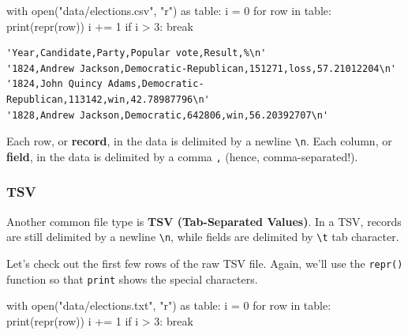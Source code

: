 \documentclass[
  letterpaper,
  DIV=11,
  numbers=noendperiod]{scrreprt}
\newenvironment{Shaded}{\begin{snugshade}}{\end{snugshade}}
\newcommand{\BuiltInTok}[1]{\textcolor[rgb]{0.00,0.23,0.31}{#1}}
\newcommand{\ControlFlowTok}[1]{\textcolor[rgb]{0.00,0.23,0.31}{#1}}
\newcommand{\DecValTok}[1]{\textcolor[rgb]{0.68,0.00,0.00}{#1}}
\newcommand{\ImportTok}[1]{\textcolor[rgb]{0.00,0.46,0.62}{#1}}
\newcommand{\KeywordTok}[1]{\textcolor[rgb]{0.00,0.23,0.31}{#1}}
\newcommand{\NormalTok}[1]{\textcolor[rgb]{0.00,0.23,0.31}{#1}}
\newcommand{\OperatorTok}[1]{\textcolor[rgb]{0.37,0.37,0.37}{#1}}
\newcommand{\StringTok}[1]{\textcolor[rgb]{0.13,0.47,0.30}{#1}}
\begin{document}
\begin{Shaded}
\begin{Highlighting}[]
\ControlFlowTok{with} \BuiltInTok{open}\NormalTok{(}\StringTok{"data/elections.csv"}\NormalTok{, }\StringTok{"r"}\NormalTok{) }\ImportTok{as}\NormalTok{ table:}
\NormalTok{    i }\OperatorTok{=} \DecValTok{0}
    \ControlFlowTok{for}\NormalTok{ row }\KeywordTok{in}\NormalTok{ table:}
        \BuiltInTok{print}\NormalTok{(}\BuiltInTok{repr}\NormalTok{(row))}
\NormalTok{        i }\OperatorTok{+=} \DecValTok{1}
        \ControlFlowTok{if}\NormalTok{ i }\OperatorTok{\textgreater{}} \DecValTok{3}\NormalTok{:}
            \ControlFlowTok{break}
\end{Highlighting}
\end{Shaded}

\begin{verbatim}
'Year,Candidate,Party,Popular vote,Result,%\n'
'1824,Andrew Jackson,Democratic-Republican,151271,loss,57.21012204\n'
'1824,John Quincy Adams,Democratic-Republican,113142,win,42.78987796\n'
'1828,Andrew Jackson,Democratic,642806,win,56.20392707\n'
\end{verbatim}

Each row, or \textbf{record}, in the data is delimited by a newline
\texttt{\textbackslash{}n}. Each column, or \textbf{field}, in the data
is delimited by a comma \texttt{,} (hence, comma-separated!).

\subsubsection{TSV}\label{tsv}

Another common file type is \textbf{TSV (Tab-Separated Values)}. In a
TSV, records are still delimited by a newline
\texttt{\textbackslash{}n}, while fields are delimited by
\texttt{\textbackslash{}t} tab character.

Let's check out the first few rows of the raw TSV file. Again, we'll use
the \texttt{repr()} function so that \texttt{print} shows the special
characters.

\begin{Shaded}
\begin{Highlighting}[]
\ControlFlowTok{with} \BuiltInTok{open}\NormalTok{(}\StringTok{"data/elections.txt"}\NormalTok{, }\StringTok{"r"}\NormalTok{) }\ImportTok{as}\NormalTok{ table:}
\NormalTok{    i }\OperatorTok{=} \DecValTok{0}
    \ControlFlowTok{for}\NormalTok{ row }\KeywordTok{in}\NormalTok{ table:}
        \BuiltInTok{print}\NormalTok{(}\BuiltInTok{repr}\NormalTok{(row))}
\NormalTok{        i }\OperatorTok{+=} \DecValTok{1}
        \ControlFlowTok{if}\NormalTok{ i }\OperatorTok{\textgreater{}} \DecValTok{3}\NormalTok{:}
            \ControlFlowTok{break}
\end{Highlighting}
\end{Shaded}
\end{document}
